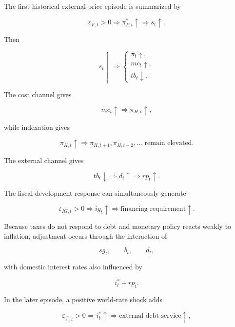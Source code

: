 The first historical external-price episode is summarized by

\begin{equation}
\varepsilon_{F,t}>0
\Rightarrow
\pi_{F,t}^{*}\uparrow
\Rightarrow
s_t\uparrow.
\end{equation}

Then

\begin{equation}
s_t\uparrow
\Rightarrow
\begin{cases}
\pi_t\uparrow,\\
mc_t\uparrow,\\
tb_t\downarrow.
\end{cases}
\end{equation}

The cost channel gives

\begin{equation}
mc_t\uparrow
\Rightarrow
\pi_{H,t}\uparrow,
\end{equation}

while indexation gives

\begin{equation}
\pi_{H,t}\uparrow
\Rightarrow
\pi_{H,t+1},\pi_{H,t+2},\ldots
\text{ remain elevated}.
\end{equation}

The external channel gives

\begin{equation}
tb_t\downarrow
\Rightarrow
d_t\uparrow
\Rightarrow
rp_t\uparrow.
\end{equation}

The fiscal-development response can simultaneously generate

\begin{equation}
\varepsilon_{IG,t}>0
\Rightarrow
ig_t\uparrow
\Rightarrow
\text{financing requirement}\uparrow.
\end{equation}

Because taxes do not respond to debt and monetary policy reacts weakly to
inflation, adjustment occurs through the interaction of

\[
sg_t,\qquad b_t,\qquad d_t,
\]

with domestic interest rates also influenced by

\[
i_t^*+rp_t.
\]

In the later episode, a positive world-rate shock adds

\begin{equation}
\varepsilon_{i^*,t}>0
\Rightarrow
i_t^*\uparrow
\Rightarrow
\text{external debt service}\uparrow,
\end{equation}


